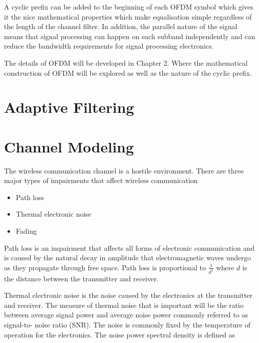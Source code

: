 A cyclic prefix can be added to the beginning of each OFDM %
symbol which gives it the nice mathematical properties %
which make equalisation simple regardless of the length %
of the channel filter. In addition, the parallel nature %
of the signal means that signal processing can happen %
on each subband independently and can reduce the bandwidth %
requirements for signal processing electronics.

The details of OFDM will be developed in Chapter 2. 
Where the mathematical construction of OFDM will be
explored as well as the nature of the cyclic prefix.

\section{Adaptive Filtering}


\section{Channel Modeling}

The wireless communication channel is a %
hostile environment. There are three %
major types of impairments that affect %
wireless communication

\begin{itemize}
	\item{Path loss}
	\item{Thermal electronic noise}
	\item{Fading}
\end{itemize}

Path loss is an impairment that affects %
all forms of electronic communication and is %
caused by the natural decay in amplitude %
that electromagnetic waves undergo as they %
propagate through free space. Path loss %
is proportional to $\frac{1}{d^2}$ where %
$d$ is the distance between the transmitter %
and receiver.

Thermal electronic noise is the noise %
caused by the electronics at the %
transmitter and receiver. The measure %
of thermal noise that is important %
will be the ratio between average %
signal power and average noise power %
commonly referred to as signal-to-%
noise ratio (SNR). The noise is %
commonly fixed by the temperature %
of operation for the electronics. %
The noise power spectral density %
is defined as %

